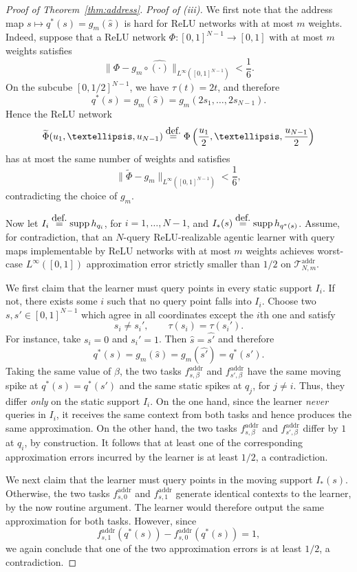 \documentclass[10pt,a4paper]{amsart}
\newcommand{\eqdef }{\ensuremath{\stackrel{\mbox{\upshape\tiny def.}}{=}}}
\begin{document}
\begin{proof}[Proof of Theorem~\ref{thm:address}]
\medskip
\noindent

\emph{Proof of (iii).}
We first note that the %
address map
$
s\mapsto q^\ast(s)=g_m(\widehat s)
$
is %
hard for ReLU networks with at most \(m\) weights. Indeed, suppose that a ReLU network
\(\Phi:[0,1]^{N-1}\to[0,1]\) with at most \(m\) weights satisfies
\[
\|\Phi-g_m\circ \widehat{(\cdot)}\|_{L^\infty([0,1]^{N-1})}<\frac16.
\]
On the subcube \([0,1/2]^{N-1}\), we have \(\tau(t)=2t\), and therefore
\[
    q^\ast(s)=g_m(\widehat{s})=g_m(2s_1,\dots,2s_{N-1}).
\]
Hence the ReLU network
\[
\widetilde \Phi(u_1,\dots,u_{N-1})
\eqdef 
\Phi\left(\frac{u_1}{2},\dots,\frac{u_{N-1}}{2}\right)
\]
has at most the same number of weights and satisfies
\[
\|\widetilde \Phi-g_m\|_{L^\infty([0,1]^{N-1})}<\frac16,
\]
contradicting the choice of \(g_m\).

Now let \(I_i\eqdef  \operatorname{supp}h_{q_i}\), for \(i=1,\dots,N-1\), and
$
    I_*(s)\eqdef  \operatorname{supp}h_{q^\ast(s)}
$.
Assume, for contradiction, that an \(N\)-query ReLU-realizable agentic learner with query maps implementable by ReLU networks with at most \(m\) weights achieves worst-case $L^{\infty}([0,1])$ approximation error strictly smaller than \(1/2\) on $\mathcal T_{N,m}^{\mathrm{addr}}$.

We first claim that the learner must query points in every static support \(I_i\). 
If not, there exists some \(i\) such that no query point falls into \(I_i\). Choose two \(s,s'\in[0,1]^{N-1}\) which agree in all coordinates except the \(i\)th one and satisfy
\[
s_i\neq s_i',
\qquad
\tau(s_i)=\tau(s_i').
\]
For instance, take \(s_i=0\) and \(s_i'=1\). Then $\widehat s=\widehat{s'}$ and therefore
\[
q^\ast(s)=g_m(\widehat s)= g_m(\widehat{s'})=q^\ast(s').
\]
Taking the same value of \(\beta\), the two tasks
\(f^{\mathrm{addr}}_{s,\beta}\) and \(f^{\mathrm{addr}}_{s',\beta}\)
have the same moving spike at $q^\ast(s)=q^\ast(s')$ and the same static spikes at $q_j$, for $j\neq i$.
Thus, they differ \emph{only} on the static support \(I_i\).
On the one hand, since the learner \emph{never} queries in \(I_i\), it receives the same %
context from both tasks and hence produces the same approximation. 
On the other hand, the two tasks \(f^{\mathrm{addr}}_{s,\beta}\) and \(f^{\mathrm{addr}}_{s',\beta}\) differ by \(1\) at \(q_i\), by construction.
It follows that at least one of the corresponding approximation errors incurred by the learner is at least \(1/2\), a contradiction.

We next claim that the learner must query points in the moving support \(I_*(s)\). Otherwise, the two tasks \(f^{\mathrm{addr}}_{s,0}\) and \(f^{\mathrm{addr}}_{s,1}\) generate identical 
contexts to the learner, by the now routine argument. %
The learner would therefore output the same approximation for both tasks. However, since
\[
f^{\mathrm{addr}}_{s,1}(q^\ast(s))
-
f^{\mathrm{addr}}_{s,0}(q^\ast(s))
=
1,
\]
we again conclude that one of the two approximation errors is at least \(1/2\), a contradiction.


\end{proof}
\end{document}
